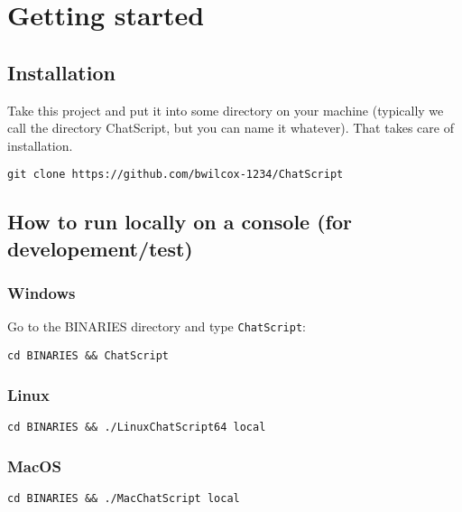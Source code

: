 \documentclass[]{article}
\begin{document}
\section{Getting started}\label{getting-started}

\subsection{Installation}\label{installation}

Take this project and put it into some directory on your machine
(typically we call the directory ChatScript, but you can name it
whatever). That takes care of installation.

\begin{verbatim}
git clone https://github.com/bwilcox-1234/ChatScript
\end{verbatim}

\subsection{How to run locally on a console (for
developement/test)}\label{how-to-run-locally-on-a-console-for-developementtest}

\subsubsection{Windows}\label{windows}

Go to the BINARIES directory and type \texttt{ChatScript}:

\begin{verbatim}
cd BINARIES && ChatScript
\end{verbatim}

\subsubsection{Linux}\label{linux}

\begin{verbatim}
cd BINARIES && ./LinuxChatScript64 local
\end{verbatim}

\subsubsection{MacOS}\label{macos}

\begin{verbatim}
cd BINARIES && ./MacChatScript local
\end{verbatim}
\end{document}
